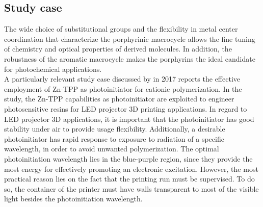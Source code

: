 \documentclass[twoside,twocolumn,9pt]{article}
\begin{document}
\subsection{Study case}
The wide choice of substitutional groups and the flexibility in metal center coordination that characterize the porphyrinic macrocycle allows the fine tuning of chemistry and optical properties of derived molecules.
In addition, the robustness of the aromatic macrocycle makes the porphyrins the ideal candidate for photochemical applications.\\
A particularly relevant study case discussed by \citet{al_mousawi_zinc_2017} in 2017 reports the effective employment of Zn-TPP as photoinitiator for cationic polymerization.
In the study, the Zn-TPP capabilities as photoinitiator are exploited to engineer photosensitive resins for LED projector 3D printing applications.
In regard to LED projector 3D applications, it is important that the photoinitiator has good stability under air to provide usage flexibility.
Additionally, a desirable photoinitiator has rapid response to exposure to radiation of a specific wavelength, in order to avoid unwanted polymerization.
The optimal photoinitiation wavelength lies in the blue-purple region, since they provide the most energy for effectively promoting an electronic excitation.
However, the most practical reason lies on the fact that the printing run must be supervised.
To do so, the container of the printer must have walls transparent to most of the visible light besides the photoinitiation wavelength.\\
\end{document}
